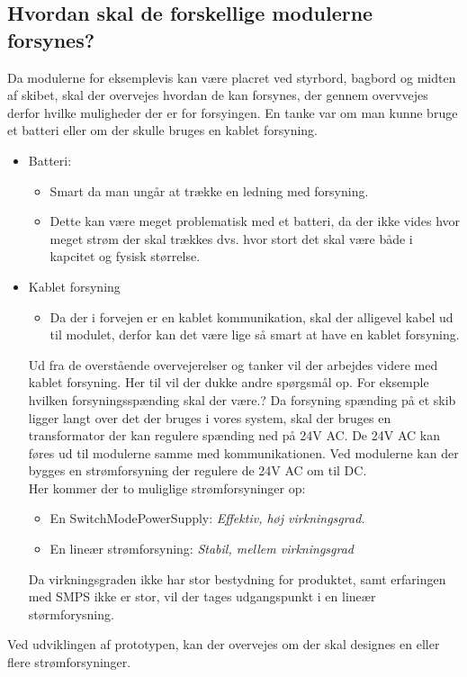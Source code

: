 \subsection{Hvordan skal de forskellige modulerne forsynes?}
Da modulerne for eksemplevis kan være placret ved styrbord, bagbord og midten af skibet, skal der overvejes hvordan de kan forsynes, der gennem overvvejes derfor hvilke muligheder der er for forsyingen.
En tanke var om man kunne bruge et batteri eller om der skulle bruges en kablet forsyning.
\begin{itemize}
\item Batteri:
	\begin{itemize}
	\item Smart da man ungår at trække en ledning med forsyning.
	\item Dette kan være meget problematisk med et batteri, da der ikke vides hvor meget strøm der skal trækkes dvs. hvor stort det skal være både i kapcitet og fysisk størrelse. \\
	\end{itemize}
\item Kablet forsyning \\
\begin{itemize}
\item Da der i forvejen er en kablet kommunikation, skal der alligevel kabel ud til modulet, derfor kan det være lige så smart at have en kablet forsyning.\\
\end{itemize}
Ud fra de overstående overvejerelser og tanker vil der arbejdes videre med kablet forsyning.
Her til vil der dukke andre spørgsmål op.
For eksemple hvilken forsyningsspænding skal der være.?
Da forsyning spænding på et skib ligger langt over det der bruges i vores system, skal der bruges en transformator der kan regulere spænding ned på 24V AC. De 24V AC kan føres ud til modulerne samme med kommunikationen. 
Ved modulerne kan der bygges en strømforsyning der regulere de 24V AC om til DC. \\
Her kommer der to muliglige strømforsyninger op:
\begin{itemize}
\item En SwitchModePowerSupply: \textit{Effektiv, høj virkningsgrad.}
\item En lineær strømforsyning: \textit{Stabil, mellem virkningsgrad}
\end{itemize}
Da virkningsgraden ikke har stor bestydning for produktet, samt erfaringen med SMPS ikke er stor, vil der tages udgangspunkt i en lineær størmforysning.
\end{itemize}
Ved udviklingen af prototypen, kan der overvejes om der skal designes en eller flere strømforsyninger.



